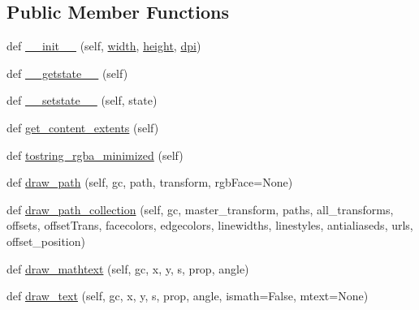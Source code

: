 \subsection*{Public Member Functions}
\begin{DoxyCompactItemize}
\item 
def \hyperlink{classmatplotlib_1_1backends_1_1backend__agg_1_1RendererAgg_ad6adb594f4f12e310c346f28c0c16b34}{\+\_\+\+\_\+init\+\_\+\+\_\+} (self, \hyperlink{classmatplotlib_1_1backends_1_1backend__agg_1_1RendererAgg_a560412f63564c0fc881c5a7d7d9a3d9c}{width}, \hyperlink{classmatplotlib_1_1backends_1_1backend__agg_1_1RendererAgg_a6c751ab022decc0e421880a526a21822}{height}, \hyperlink{classmatplotlib_1_1backends_1_1backend__agg_1_1RendererAgg_a6042792c0f90a0dd7a964f9de1b5bfca}{dpi})
\item 
def \hyperlink{classmatplotlib_1_1backends_1_1backend__agg_1_1RendererAgg_a0bd2245538d160e107bb50e362e24951}{\+\_\+\+\_\+getstate\+\_\+\+\_\+} (self)
\item 
def \hyperlink{classmatplotlib_1_1backends_1_1backend__agg_1_1RendererAgg_ab8825267d2b2c41f268486187084fd68}{\+\_\+\+\_\+setstate\+\_\+\+\_\+} (self, state)
\item 
def \hyperlink{classmatplotlib_1_1backends_1_1backend__agg_1_1RendererAgg_a2370fc3c6072af1d7eb80666cc03a563}{get\+\_\+content\+\_\+extents} (self)
\item 
def \hyperlink{classmatplotlib_1_1backends_1_1backend__agg_1_1RendererAgg_a03ebc2505703d3e34c9f7a28750b6228}{tostring\+\_\+rgba\+\_\+minimized} (self)
\item 
def \hyperlink{classmatplotlib_1_1backends_1_1backend__agg_1_1RendererAgg_a986465c0b56d47a135d605bd1525fb65}{draw\+\_\+path} (self, gc, path, transform, rgb\+Face=None)
\item 
def \hyperlink{classmatplotlib_1_1backends_1_1backend__agg_1_1RendererAgg_a14af95dabc9f6fecaffc07d33d4014a4}{draw\+\_\+path\+\_\+collection} (self, gc, master\+\_\+transform, paths, all\+\_\+transforms, offsets, offset\+Trans, facecolors, edgecolors, linewidths, linestyles, antialiaseds, urls, offset\+\_\+position)
\item 
def \hyperlink{classmatplotlib_1_1backends_1_1backend__agg_1_1RendererAgg_af3bf409101f5c4014d295aab3f272086}{draw\+\_\+mathtext} (self, gc, x, y, s, prop, angle)
\item 
def \hyperlink{classmatplotlib_1_1backends_1_1backend__agg_1_1RendererAgg_a0ac0c3dd0b3ec8f12ff2f291b287282b}{draw\+\_\+text} (self, gc, x, y, s, prop, angle, ismath=False, mtext=None)

\end{DoxyCompactItemize}
